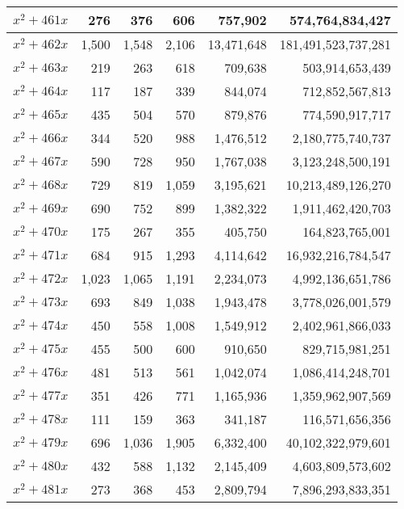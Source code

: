 \documentclass[a4paper]{amsproc}
\theoremstyle{plain}
\begin{document}
\begin{longtable}{ | l | r | r | r | r | r | }
$x^2 + 461x$ & 276 & 376 & 606 & 757{,}902 & 574{,}764{,}834{,}427 \\ \hline
$x^2 + 462x$ & 1{,}500 & 1{,}548 & 2{,}106 & 13{,}471{,}648 & 181{,}491{,}523{,}737{,}281 \\ \hline
$x^2 + 463x$ & 219 & 263 & 618 & 709{,}638 & 503{,}914{,}653{,}439 \\ \hline
$x^2 + 464x$ & 117 & 187 & 339 & 844{,}074 & 712{,}852{,}567{,}813 \\ \hline
$x^2 + 465x$ & 435 & 504 & 570 & 879{,}876 & 774{,}590{,}917{,}717 \\ \hline
$x^2 + 466x$ & 344 & 520 & 988 & 1{,}476{,}512 & 2{,}180{,}775{,}740{,}737 \\ \hline
$x^2 + 467x$ & 590 & 728 & 950 & 1{,}767{,}038 & 3{,}123{,}248{,}500{,}191 \\ \hline
$x^2 + 468x$ & 729 & 819 & 1{,}059 & 3{,}195{,}621 & 10{,}213{,}489{,}126{,}270 \\ \hline
$x^2 + 469x$ & 690 & 752 & 899 & 1{,}382{,}322 & 1{,}911{,}462{,}420{,}703 \\ \hline
$x^2 + 470x$ & 175 & 267 & 355 & 405{,}750 & 164{,}823{,}765{,}001 \\ \hline
$x^2 + 471x$ & 684 & 915 & 1{,}293 & 4{,}114{,}642 & 16{,}932{,}216{,}784{,}547 \\ \hline
$x^2 + 472x$ & 1{,}023 & 1{,}065 & 1{,}191 & 2{,}234{,}073 & 4{,}992{,}136{,}651{,}786 \\ \hline
$x^2 + 473x$ & 693 & 849 & 1{,}038 & 1{,}943{,}478 & 3{,}778{,}026{,}001{,}579 \\ \hline
$x^2 + 474x$ & 450 & 558 & 1{,}008 & 1{,}549{,}912 & 2{,}402{,}961{,}866{,}033 \\ \hline
$x^2 + 475x$ & 455 & 500 & 600 & 910{,}650 & 829{,}715{,}981{,}251 \\ \hline
$x^2 + 476x$ & 481 & 513 & 561 & 1{,}042{,}074 & 1{,}086{,}414{,}248{,}701 \\ \hline
$x^2 + 477x$ & 351 & 426 & 771 & 1{,}165{,}936 & 1{,}359{,}962{,}907{,}569 \\ \hline
$x^2 + 478x$ & 111 & 159 & 363 & 341{,}187 & 116{,}571{,}656{,}356 \\ \hline
$x^2 + 479x$ & 696 & 1{,}036 & 1{,}905 & 6{,}332{,}400 & 40{,}102{,}322{,}979{,}601 \\ \hline
$x^2 + 480x$ & 432 & 588 & 1{,}132 & 2{,}145{,}409 & 4{,}603{,}809{,}573{,}602 \\ \hline
$x^2 + 481x$ & 273 & 368 & 453 & 2{,}809{,}794 & 7{,}896{,}293{,}833{,}351 \\ \hline

\end{longtable}
\end{document}
